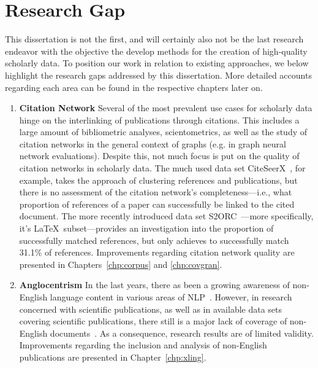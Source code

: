 
\section{Research Gap}\label{sec:intro-gap}

This dissertation is not the first, and will certainly also not be the last research endeavor with the objective the develop methods for the creation of high-quality scholarly data. To position our work in relation to existing approaches, we below highlight the research gaps addressed by this dissertation. More detailed accounts regarding each area can be found in the respective chapters later on.

\begin{enumerate}
    \item \textbf{Citation Network} Several of the most prevalent use cases for scholarly data hinge on the interlinking of publications through citations. This includes a large amount of bibliometric analyses, scientometrics, as well as the study of citation networks in the general context of graphs (e.g. in graph neural network evaluations). Despite this, not much focus is put on the quality of citation networks in scholarly data. The much used data set CiteSeerX~\cite{Wu2015,Wu2016,Patel2021}, for example, takes the approach of clustering references and publications, but there is no assessment of the citation network's completeness---i.e., what proportion of references of a paper can successfully be linked to the cited document. The more recently introduced data set S2ORC~\cite{Lo2020}---more specifically, it's \LaTeX\ subset---provides an investigation into the proportion of successfully matched references, but only achieves to successfully match 31.1\% of references. Improvements regarding citation network quality are presented in Chapters~\ref{chp:corpus} and \ref{chp:covgran}.
    \item \textbf{Anglocentrism} In the last years, there as been a growing awareness of non-English language content in various areas of NLP~\cite{Dabre2020,Yu2022,Ramesh2023}. However, in research concerned with scientific publications, as well as in available data sets covering scientific publications, there still is a major lack of coverage of non-English documents~\cite{Vera-Baceta2019,Liu2019,Moed2018,Moskaleva2019,MartinMartin2021}. As a consequence, research results are of limited validity. Improvements regarding the inclusion and analysis of non-English publications are presented in Chapter~\ref{chp:xling}.

\end{enumerate}
